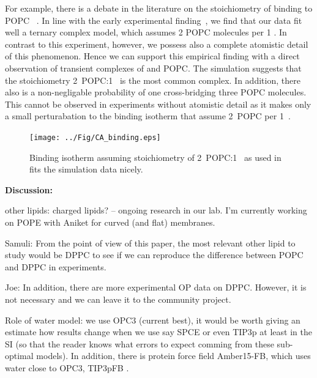 \documentclass[aip,jcp,twocolumn]{revtex4}
\begin{document}
For example, there is a debate in the literature on the stoichiometry of  binding to POPC~\cite{Altenbach84} . 
In line with the early experimental finding~\cite{Altenbach84}, we find that our data fit well a ternary complex model, which assumes 2 POPC molecules per 1 . 
In contrast to this experiment, however, we possess also a complete atomistic detail of this phenomenon.
Hence we can support this empirical finding with a direct observation of transient complexes of  and POPC.
The simulation suggests that the stoichiometry 2~POPC:1~ is the most common complex. 
In addition, there also is a non-negligable probability of one   cross-bridging three POPC molecules. 
This cannot be observed in experiments without atomistic detail as it makes only a small perturabation to the binding isotherm that assume 2~POPC per 1~. 

\begin{figure}[]
  \centering
  \texttt{[image: ../Fig/CA\_binding.eps]}
  \caption{\label{fig:cacl-bind}
    Binding isotherm assuming stoichiometry of 2~POPC:1~ as used in \cite{Altenbach84} fits the simulation data nicely.}
\end{figure}



\textbf{Discussion:}

other lipids: charged lipids? -- ongoing research in our lab.
I'm currently working on POPE with Aniket for curved (and flat) membranes. 

Samuli: From the point of view of this paper, the most relevant other lipid to study would be DPPC to see if we can reproduce the difference between POPC and DPPC in experiments.

Joe: In addition, there are more experimental OP data on DPPC. However, it is not necessary and we can leave it to the community project. 

Role of water model: we use OPC3 (current best), it would be worth giving an estimate how results change when we use say SPCE or even TIP3p at least in the SI (so that the reader knows what errors to expect comming from these sub-optimal models). 
In addition, there is protein force field Amber15-FB, which uses water close to OPC3, TIP3pFB .
\end{document}

